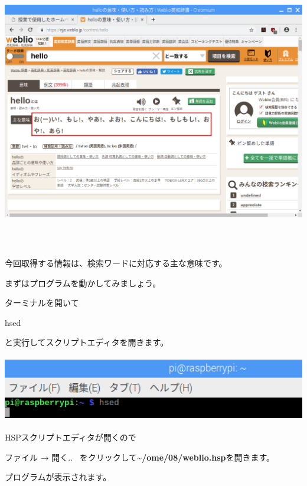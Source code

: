 \documentclass[a4paper,12pt,dvipdfmx]{jarticle}
\begin{document}
\begin{center}
\includegraphics[width=17.006cm,height=12.157cm]{textbook-img046.png}

\end{center}
今回取得する情報は、検索ワードに対応する主な意味です。

まずはプログラムを動かしてみましょう。

ターミナルを開いて

hsed

と実行してスクリプトエディタを開きます。



\begin{center}
\includegraphics[width=17.057cm,height=2.866cm]{textbook-img013.png}

\end{center}
\clearpage
HSPスクリプトエディタが開くので

ファイル → 開く..
\ をクリックして\textbf{\~{}/ome/08/weblio.hsp}を開きます。

プログラムが表示されます。
\end{document}
